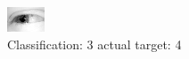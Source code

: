 \begin{figure}[h!]
\begin{center}
\includegraphics[width=0.60\columnwidth]{figures/ID2472_class_3_target_4.png}
\end{center}
\caption{ Classification: 3 actual target: 4}
\label{fig:ID2472_class_3_target_4}
\end{figure}
